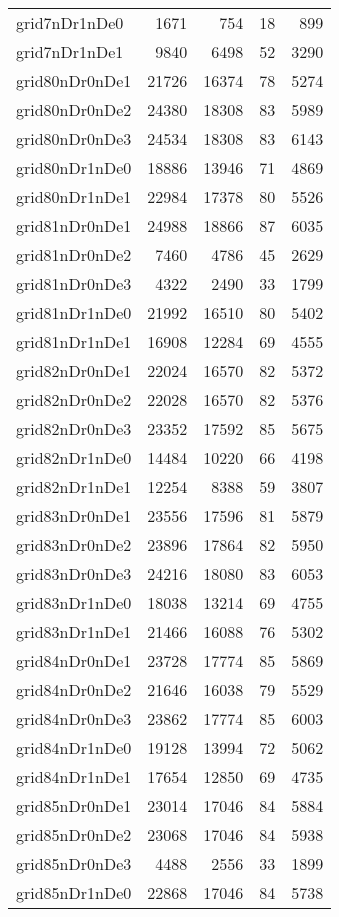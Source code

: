 \begin{longtable}{lrrrr}
grid7nDr1nDe0 & 1671 & 754 & 18 & 899 \\
grid7nDr1nDe1 & 9840 & 6498 & 52 & 3290 \\
grid80nDr0nDe1 & 21726 & 16374 & 78 & 5274 \\
grid80nDr0nDe2 & 24380 & 18308 & 83 & 5989 \\
grid80nDr0nDe3 & 24534 & 18308 & 83 & 6143 \\
grid80nDr1nDe0 & 18886 & 13946 & 71 & 4869 \\
grid80nDr1nDe1 & 22984 & 17378 & 80 & 5526 \\
grid81nDr0nDe1 & 24988 & 18866 & 87 & 6035 \\
grid81nDr0nDe2 & 7460 & 4786 & 45 & 2629 \\
grid81nDr0nDe3 & 4322 & 2490 & 33 & 1799 \\
grid81nDr1nDe0 & 21992 & 16510 & 80 & 5402 \\
grid81nDr1nDe1 & 16908 & 12284 & 69 & 4555 \\
grid82nDr0nDe1 & 22024 & 16570 & 82 & 5372 \\
grid82nDr0nDe2 & 22028 & 16570 & 82 & 5376 \\
grid82nDr0nDe3 & 23352 & 17592 & 85 & 5675 \\
grid82nDr1nDe0 & 14484 & 10220 & 66 & 4198 \\
grid82nDr1nDe1 & 12254 & 8388 & 59 & 3807 \\
grid83nDr0nDe1 & 23556 & 17596 & 81 & 5879 \\
grid83nDr0nDe2 & 23896 & 17864 & 82 & 5950 \\
grid83nDr0nDe3 & 24216 & 18080 & 83 & 6053 \\
grid83nDr1nDe0 & 18038 & 13214 & 69 & 4755 \\
grid83nDr1nDe1 & 21466 & 16088 & 76 & 5302 \\
grid84nDr0nDe1 & 23728 & 17774 & 85 & 5869 \\
grid84nDr0nDe2 & 21646 & 16038 & 79 & 5529 \\
grid84nDr0nDe3 & 23862 & 17774 & 85 & 6003 \\
grid84nDr1nDe0 & 19128 & 13994 & 72 & 5062 \\
grid84nDr1nDe1 & 17654 & 12850 & 69 & 4735 \\
grid85nDr0nDe1 & 23014 & 17046 & 84 & 5884 \\
grid85nDr0nDe2 & 23068 & 17046 & 84 & 5938 \\
grid85nDr0nDe3 & 4488 & 2556 & 33 & 1899 \\
grid85nDr1nDe0 & 22868 & 17046 & 84 & 5738 \\

\end{longtable}
